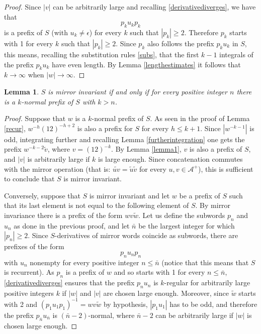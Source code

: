 \documentclass[10pt,a4paper]{article}
\newtheorem{lemma}{Lemma}
\begin{document}
\begin{proof}
 Since $|v|$ can be arbitrarily large and recalling \eqref{derivativediverges}, we have that $$p_k u_k p_k$$ is a prefix of $S$ (with $u_k\ne \epsilon$) for every $k$ such that $|p_k|\ge 2$. Therefore $p_k$ starts with 1 for every $k$ such that $|p_k|\ge 2$. Since $p_k$ also follows the prefix $p_ku_k$ in $S$, this means, recalling the substitution rules \eqref{subs}, that the first $k-1$ integrals of the prefix $p_{k} u_{k}$ have even length. By Lemma \ref{lengthestimates} it follows that $k \rightarrow \infty$ when $|w|\rightarrow \infty$.   
\end{proof}
\begin{lemma}
$S$ is mirror invariant if and only if for every positive integer $n$ there is a $k$-normal prefix of $S$ with $k>n$.
\label{mirroring}
\end{lemma}
\begin{proof}
 Suppose that $w$ is a $k$-normal prefix of $S$. As seen in the proof of Lemma \ref{recur}, $w^{-h}(12)^{-h+2}$ is also a prefix for $S$ for every $h\le k+1$. Since $|w^{-k-1}|$ is odd, integrating further and recalling Lemma \ref{furtherintegration} one gets the prefix $w^{-k-2}\widetilde{v}$, where $v=(12)^{-k}$.  By Lemma \ref{lemma1}, $v$ is also a prefix of $S$, and $|v|$ is arbitrarily large if $k$ is large enough. Since concatenation commutes with the mirror operation (that is: $\widetilde{uv}=\widetilde{u}\widetilde{v}$ for every $u,v \in \mathcal{A^+}$), this is sufficient to conclude that $S$ is mirror invariant. 

 Conversely, suppose that $S$ is mirror invariant and let $w$ be a prefix of $S$ such that its last element is not equal to the following element of $S$. By mirror invariance there is a prefix of the form $wv\widetilde{w}$. Let us define the subwords $p_n$ and $u_n$ as done in the previous proof, and let $\bar{n}$ be the largest integer for which $|p_n|\ge 2$. Since $S$-derivatives of mirror words coincide as subwords, there are prefixes of the form $$p_n u_n p_n$$ with $u_n$ nonempty for every positive integer $n\le\bar{n}$ (notice that this means that $S$ is recurrent). As $p_n$ is a prefix of $w$ and so starts with 1 for every $n\le\bar{n}$, \eqref{derivativediverges} ensures that the prefix $p_n u_n$ is $k$-regular for arbitrarily large positive integers $k$ if $|w|$ and $|v|$ are chosen large enough.  Moreover, since $\widetilde{w}$ starts with 2 and $(p_1u_1p_1)^{-1}=wv\widetilde{w}$  by hypothesis, $|p_1u_1|$ has to be odd, and therefore the prefix $p_{\bar{n}}u_{\bar{n}}$ is $(\bar{n}-2)$-normal, where $\bar{n}-2$ can be arbitrarily large if $|w|$ is chosen large enough.    
\end{proof}
\end{document}
